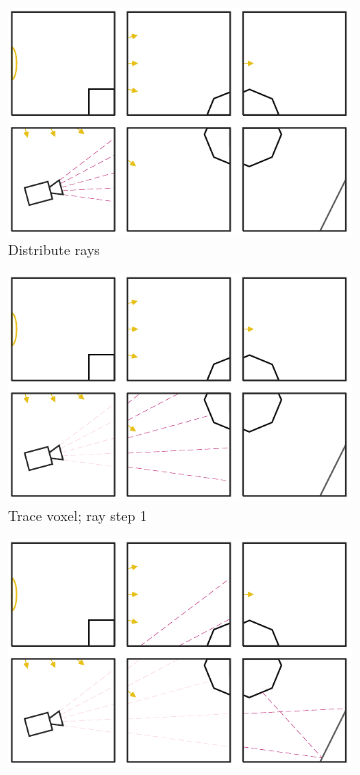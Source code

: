 \begin{figure}[!htb]
\centering
\begin{subfigure}{.49\columnwidth}
 \centering
  \includegraphics[width=.98\columnwidth]{drawings/Trace1.pdf}
  \caption{Distribute rays}
\end{subfigure}
\begin{subfigure}{.49\columnwidth}
 \centering
  \includegraphics[width=.98\columnwidth]{drawings/Trace2.pdf}
  \caption{Trace voxel; ray step 1}
\end{subfigure}
\begin{subfigure}{.49\columnwidth}
 \centering
  \includegraphics[width=.98\columnwidth]{drawings/Trace3.pdf}

\end{subfigure}
\end{figure}
